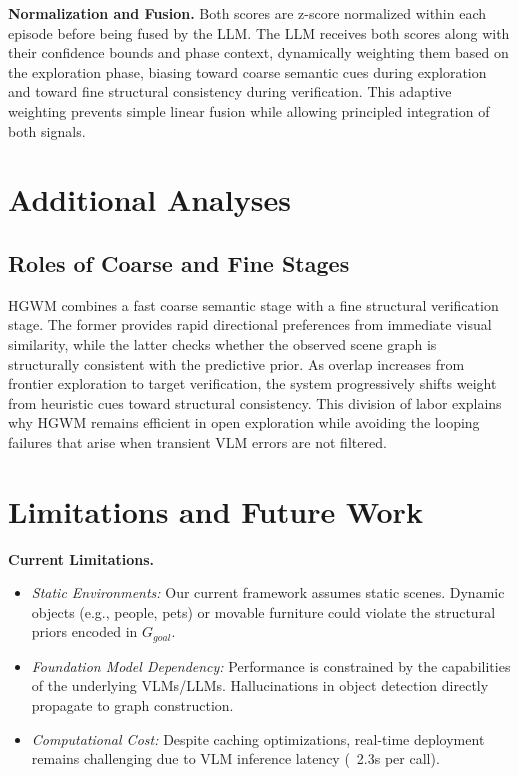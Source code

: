 \documentclass{article}
\begin{document}
\textbf{Normalization and Fusion.} Both scores are z-score normalized within each episode before being fused by the LLM. The LLM receives both scores along with their confidence bounds and phase context, dynamically weighting them based on the exploration phase, biasing toward coarse semantic cues during exploration and toward fine structural consistency during verification. This adaptive weighting prevents simple linear fusion while allowing principled integration of both signals.

\section{Additional Analyses}

\subsection{Roles of Coarse and Fine Stages}

HGWM combines a fast coarse semantic stage with a fine structural verification stage. The former provides rapid directional preferences from immediate visual similarity, while the latter checks whether the observed scene graph is structurally consistent with the predictive prior. As overlap increases from frontier exploration to target verification, the system progressively shifts weight from heuristic cues toward structural consistency. This division of labor explains why HGWM remains efficient in open exploration while avoiding the looping failures that arise when transient VLM errors are not filtered.


\section{Limitations and Future Work}

\textbf{Current Limitations.}
\begin{itemize}
    \item \textit{Static Environments:} Our current framework assumes static scenes. Dynamic objects (e.g., people, pets) or movable furniture could violate the structural priors encoded in $G_{goal}$.
    \item \textit{Foundation Model Dependency:} Performance is constrained by the capabilities of the underlying VLMs/LLMs. Hallucinations in object detection directly propagate to graph construction.
    \item \textit{Computational Cost:} Despite caching optimizations, real-time deployment remains challenging due to VLM inference latency (~2.3s per call).
\end{itemize}
\end{document}
